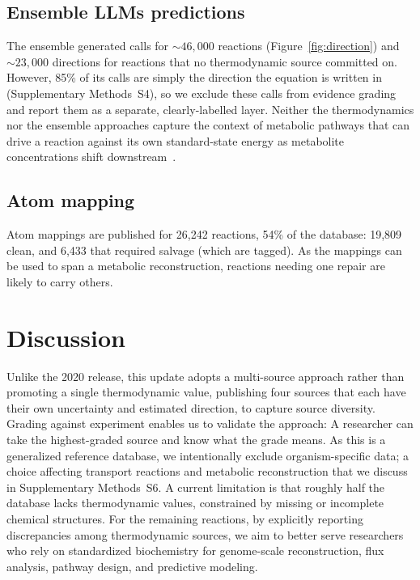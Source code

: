 \documentclass[unnumsec,webpdf,modern,large]{oup-authoring-template}
\begin{document}
\subsection{Ensemble LLMs predictions}\label{sec:llm-grading-rslts}
The ensemble generated calls for $\sim46,000$ reactions (Figure~\ref{fig:direction}) and $\sim23,000$ directions for reactions that no thermodynamic source committed on.
However, 85\% of its calls are simply the direction the equation is written in (Supplementary Methods~S4), so we exclude these calls from evidence grading and report them as a separate, clearly-labelled layer.
Neither the thermodynamics nor the ensemble approaches capture the context of metabolic pathways that can drive a reaction against its own standard-state energy as metabolite concentrations shift downstream~\cite{noor2014}.
\subsection{Atom mapping}\label{sec:results-mapping}

Atom mappings are published for 26,242 reactions, 54\% of the database: 19,809 clean, and 6,433 that required salvage (which are tagged). As the mappings can be used to span a metabolic reconstruction, reactions needing one repair are likely to carry others.

\section{Discussion}

Unlike the 2020 release, this update adopts a multi-source approach rather than promoting a single thermodynamic value, publishing four sources that each have their own uncertainty and estimated direction, to capture source diversity.
Grading against experiment enables us to validate the approach: A researcher can take the highest-graded source and know what the grade means.
As this is a generalized reference database, we intentionally exclude organism-specific data; a choice affecting transport reactions and metabolic reconstruction that we discuss in Supplementary Methods~S6.
A current limitation is that roughly half the database lacks thermodynamic values, constrained by missing or incomplete chemical structures.
For the remaining reactions, by explicitly reporting discrepancies among thermodynamic sources, we aim to better serve researchers who rely on standardized biochemistry for genome-scale reconstruction, flux analysis, pathway design, and predictive modeling.
\end{document}
